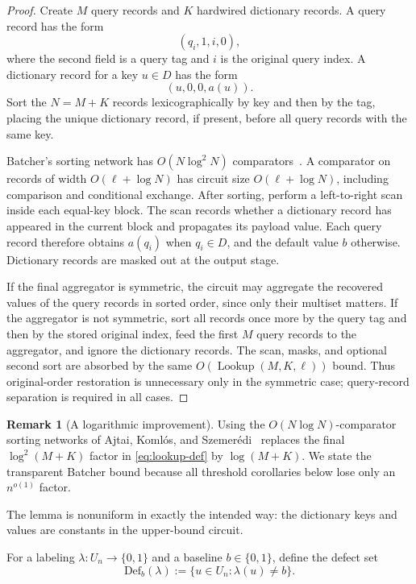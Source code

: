 \documentclass[11pt]{article}
\theoremstyle{definition}
\newtheorem{remark}[theorem]{Remark}
\newcommand{\bits}{\{0,1\}}
\newcommand{\Lookup}{\operatorname{Lookup}}
\begin{document}
\begin{proof}
Create \(M\) query records and \(K\) hardwired dictionary records.  A query record has the form
\[
  (q_i,1,i,0),
\]
where the second field is a query tag and \(i\) is the original query index.  A dictionary record for a key \(u\in D\) has the form
\[
  (u,0,0,a(u)).
\]
Sort the \(N=M+K\) records lexicographically by key and then by the tag, placing the unique dictionary record, if present, before all query records with the same key.

Batcher's sorting network has \(O(N\log^2N)\) comparators~\cite{Batcher68}.  A comparator on records of width \(O(\ell+\log N)\) has circuit size \(O(\ell+\log N)\), including comparison and conditional exchange.  After sorting, perform a left-to-right scan inside each equal-key block.  The scan records whether a dictionary record has appeared in the current block and propagates its payload value.  Each query record therefore obtains \(a(q_i)\) when \(q_i\in D\), and the default value \(b\) otherwise.  Dictionary records are masked out at the output stage.

If the final aggregator is symmetric, the circuit may aggregate the recovered values of the query records in sorted order, since only their multiset matters.  If the aggregator is not symmetric, sort all records once more by the query tag and then by the stored original index, feed the first \(M\) query records to the aggregator, and ignore the dictionary records.  The scan, masks, and optional second sort are absorbed by the same \(O(\Lookup(M,K,\ell))\) bound.  Thus original-order restoration is unnecessary only in the symmetric case; query-record separation is required in all cases.
\end{proof}

\begin{remark}[A logarithmic improvement]\label{rem:aks}
Using the $O(N\log N)$-comparator sorting networks of Ajtai, Koml\'os, and Szemer\'edi~\cite{AKS83} replaces the final $\log^2(M+K)$ factor in \eqref{eq:lookup-def} by $\log(M+K)$.  We state the transparent Batcher bound because all threshold corollaries below lose only an $n^{o(1)}$ factor.
\end{remark}

The lemma is nonuniform in exactly the intended way: the dictionary keys and values are constants in the upper-bound circuit.

For a labeling $\lambda:U_n\to\bits$ and a baseline $b\in\bits$, define the defect set
\[
  \mathrm{Def}_b(\lambda)
  :=\{u\in U_n:\lambda(u)\ne b\}.
\]
\end{document}
